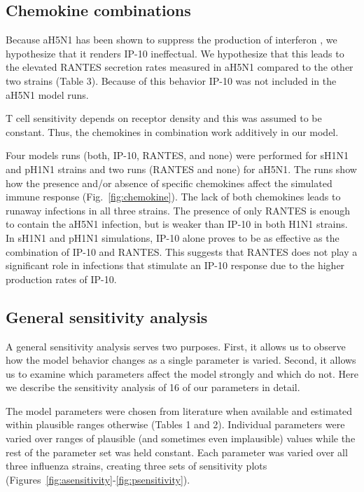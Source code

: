 \documentclass[10pt]{article}
\begin{document}
\subsection{Chemokine combinations}

Because aH5N1 has been shown to suppress the production of interferon \cite{Mitchell2011}, we hypothesize that it renders IP-10 ineffectual.  We hypothesize that this leads to the elevated RANTES secretion rates measured in aH5N1 compared to the other two strains (Table 3).  Because of this behavior IP-10 was not included in the aH5N1 model runs. 

T cell sensitivity depends on receptor density \cite{Desmetz2006} and this was assumed to be constant.  Thus, the chemokines in combination work additively in our model. 

Four models runs (both, IP-10, RANTES, and none) were performed for sH1N1 and pH1N1 strains and two runs (RANTES and none) for  aH5N1.  The runs show how the presence and/or absence of specific chemokines affect the simulated immune response (Fig.~\ref{fig:chemokine}).  The lack of both chemokines leads to runaway infections in all three strains.  The presence of only RANTES is enough to contain the aH5N1 infection, but is weaker than IP-10 in both H1N1 strains.  In sH1N1 and pH1N1 simulations, IP-10 alone proves to be as effective as the combination of IP-10 and RANTES.  This suggests that RANTES does not play a significant role in infections that stimulate an IP-10 response due to the higher production rates of IP-10.  


\subsection{General sensitivity analysis}

A general sensitivity analysis serves two purposes.  First, it allows us to observe how the model behavior changes as a single parameter is varied.  Second, it allows us to examine which parameters affect the model strongly and which do not.  Here we describe the sensitivity analysis of 16 of our parameters in detail.

The model parameters were chosen from literature when available and estimated within plausible ranges otherwise (Tables 1 and 2).  Individual parameters were varied over ranges of plausible (and sometimes even implausible) values while the rest of the parameter set was held constant.  Each parameter was varied over all three influenza strains, creating three sets of sensitivity plots (Figures~\ref{fig:asensitivity}-\ref{fig:psensitivity}).
\end{document}
